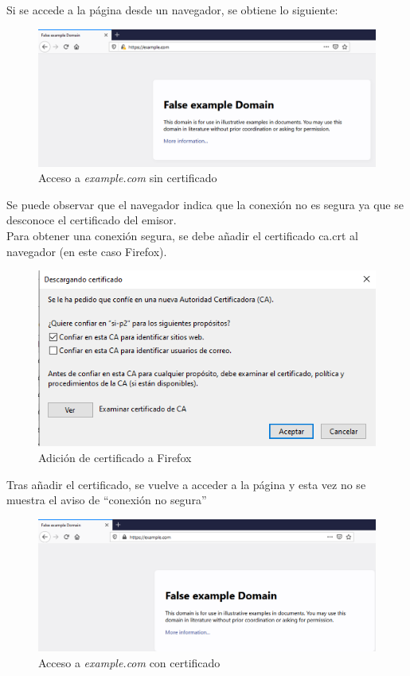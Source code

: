\documentclass[10pt,a4paper]{article}
\begin{document}
Si se accede a la página desde un navegador, se obtiene lo siguiente: 

\begin{figure}[h!]
	\centering
	\includegraphics[scale=0.5]{images/Tarea5_paso3.png}
	\caption{Acceso a \textit{example.com } sin certificado}
	\label{fig:Tarea5_paso3}
\end{figure}

Se puede observar que el navegador indica que la conexión no es segura ya que se desconoce el certificado del emisor.\\

Para obtener una conexión segura, se debe añadir el certificado ca.crt al navegador (en este caso Firefox).\\
\begin{figure}[h!]
	\centering
	\includegraphics[scale=0.6]{images/Tarea5_paso4a.png}
	\caption{Adición de certificado a Firefox}
	\label{fig:Tarea5_paso4a}
\end{figure}

Tras añadir el certificado, se vuelve a acceder a la página y esta vez no se muestra el aviso de ``conexión no segura''\\
\begin{figure}[h!]
	\centering
	\includegraphics[scale=0.5]{images/Tarea5_paso4b.png}
	\caption{Acceso a \textit{example.com } con certificado}
	\label{fig:Tarea5_paso4b}
\end{figure}
\end{document}
